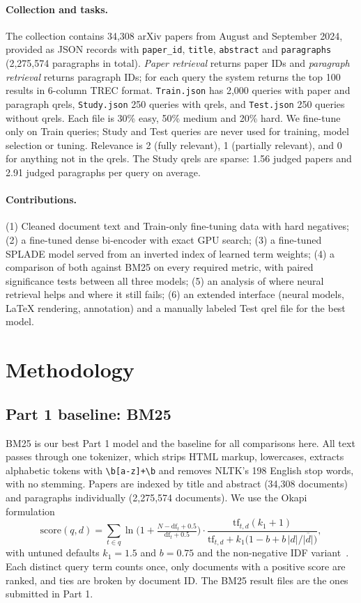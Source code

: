 \documentclass[sigconf,nonacm]{acmart}
\begin{document}
\paragraph{Collection and tasks.} The collection contains 34{,}308 arXiv papers from August and September 2024, provided as JSON records with \texttt{paper\_id}, \texttt{title}, \texttt{abstract} and \texttt{paragraphs} (2{,}275{,}574 paragraphs in total). \emph{Paper retrieval} returns paper IDs and \emph{paragraph retrieval} returns paragraph IDs; for each query the system returns the top 100 results in 6-column TREC format. \texttt{Train.json} has 2{,}000 queries with paper and paragraph qrels, \texttt{Study.json} 250 queries with qrels, and \texttt{Test.json} 250 queries without qrels. Each file is 30\% easy, 50\% medium and 20\% hard. We fine-tune only on Train queries; Study and Test queries are never used for training, model selection or tuning. Relevance is 2 (fully relevant), 1 (partially relevant), and 0 for anything not in the qrels. The Study qrels are sparse: 1.56 judged papers and 2.91 judged paragraphs per query on average.

\paragraph{Contributions.} (1) Cleaned document text and Train-only fine-tuning data with hard negatives; (2) a fine-tuned dense bi-encoder with exact GPU search; (3) a fine-tuned SPLADE model served from an inverted index of learned term weights; (4) a comparison of both against BM25 on every required metric, with paired significance tests between all three models; (5) an analysis of where neural retrieval helps and where it still fails; (6) an extended interface (neural models, LaTeX rendering, annotation) and a manually labeled Test qrel file for the best model.

\section{Methodology}
\subsection{Part 1 baseline: BM25}
BM25 is our best Part 1 model and the baseline for all comparisons here. All text passes through one tokenizer, which strips HTML markup, lowercases, extracts alphabetic tokens with \verb|\b[a-z]+\b| and removes NLTK's 198 English stop words, with no stemming. Papers are indexed by title and abstract (34{,}308 documents) and paragraphs individually (2{,}275{,}574 documents). We use the Okapi formulation
\[
\mathrm{score}(q,d)=\sum_{t\in q}\ln\!\Big(1+\tfrac{N-\mathrm{df}_t+0.5}{\mathrm{df}_t+0.5}\Big)\cdot
\frac{\mathrm{tf}_{t,d}(k_1+1)}{\mathrm{tf}_{t,d}+k_1\big(1-b+b\,|d|/\overline{|d|}\big)},
\]
with untuned defaults $k_1=1.5$ and $b=0.75$ and the non-negative IDF variant~\cite{bm25}. Each distinct query term counts once, only documents with a positive score are ranked, and ties are broken by document ID. The BM25 result files are the ones submitted in Part 1.
\end{document}
